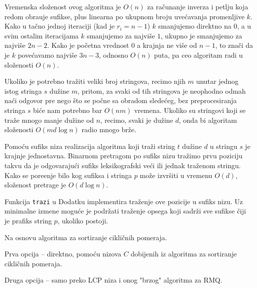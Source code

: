 Vremenska slo\v zenost ovog algoritma je $O(n)$ za ra\v cunanje inverza i petlju koja redom obra\dj uje sufikse, plus linearna po ukupnom broju uve\' cavanja promenljive $k$. Kako u ta\v cno jednoj iteraciji (kad je $r_i = n-1$) $k$ smanjujemo direktno na $0$, a u svim ostalim iteracijama $k$ smanjujemo za najvi\v se $1$, ukupno je smanjujemo za najvi\v se $2n-2$. Kako je po\v cetna vrednost $0$ a krajnja ne vi\v se od $n-1$, to zna\v ci da je $k$ pove\' cavamo najvi\v se $3n-3$, odnosno $O(n)$ puta, pa ceo algoritam radi u slo\v zenosti $O(n)$.



Ukoliko je potrebno tra\v ziti veliki broj stringova, recimo njih $m$ unutar jednog istog stringa $s$ du\v zine $m$, pritom, za svaki od tih stringova je neophodno odmah na\' ci odgovor pre nego \v sto se po\v cne sa obradom slede\' ceg, bez preprocesiranja stringa $s$ bi\' ce nam potrebno bar $O(nm)$ vremena. Ukoliko su stringovi koji se tra\v ze mnogo manje du\v zine od $n$, recimo, svaki je du\v zine $d$, onda bi algoritam slo\v zenosti $O(md\log n)$ radio mnogo br\v ze.

Pomo\' cu sufiks niza realizacija algoritma koji tra\v zi string $t$ du\v zine $d$ u stringu $s$ je krajnje jednostavna. Binarnom pretragom po sufiks nizu tra\v zimo prvu poziciju takvu da je odgovaraju\' ci sufiks leksikografski ve\' ci ili jednak tra\v zenom stringu. Kako se pore\dj enje bilo kog sufiksa i stringa $p$ mo\v ze izvr\v siti u vremenu $O(d)$, slo\v zenost pretrage je $O(d \log n)$.

Funkcija \texttt{trazi} u Dodatku \sirdodatak implementira tra\v zenje ove pozicije u sufiks nizu. Uz minimalne izmene mogu\' ce je podr\v zati tra\v zenje opsega koji sadr\v zi sve sufikse \v ciji je prafiks string $p$, ukoliko postoji.


Na osnovu algoritma za sortiranje cikli\v cnih pomeraja.


Prva opcija -- direktno, pomo\' cu nizova $C$ dobijenih iz algoritma za sortiranje cikli\v cnih pomeraja.

Druga opcija -- samo preko LCP niza i onog "brzog" algoritma za RMQ.